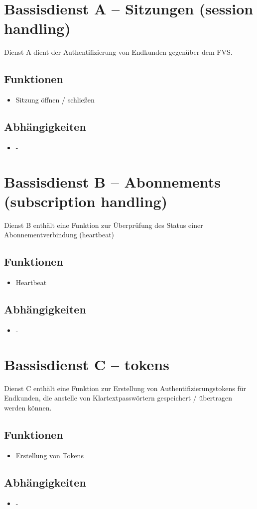 \section{Bassisdienst A -- Sitzungen (session handling)}
Dienst A dient der Authentifizierung von Endkunden gegenüber dem FVS.

\subsection*{Funktionen}
\begin{itemize}
\item Sitzung öffnen / schließen
\end{itemize}

\subsection*{Abhängigkeiten}
\begin{itemize}
\item -
\end{itemize}


\section{Bassisdienst B -- Abonnements (subscription handling)}
Dienst B enthält eine Funktion zur Überprüfung des Status einer Abonnementverbindung (heartbeat)

\subsection*{Funktionen}
\begin{itemize}
\item Heartbeat
\end{itemize}

\subsection*{Abhängigkeiten}
\begin{itemize}
\item -
\end{itemize}

\section{Bassisdienst C -- tokens}
Dienst C enthält eine Funktion zur Erstellung von Authentifizierungstokens für Endkunden, die anstelle von Klartextpasswörtern gespeichert / übertragen werden können.

\subsection*{Funktionen}
\begin{itemize}
\item Erstellung von Tokens
\end{itemize}

\subsection*{Abhängigkeiten}
\begin{itemize}
\item -
\end{itemize}

